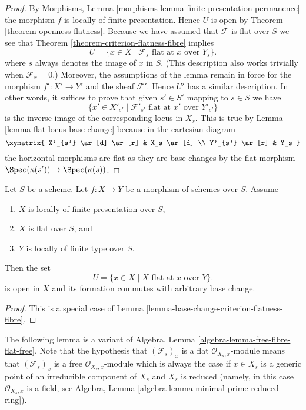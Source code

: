 \begin{proof}
By
Morphisms, Lemma \ref{morphisms-lemma-finite-presentation-permanence}
the morphism $f$ is locally of finite presentation.
Hence $U$ is open by
Theorem \ref{theorem-openness-flatness}.
Because we have assumed that $\mathcal{F}$ is flat over $S$ we see that
Theorem \ref{theorem-criterion-flatness-fibre}
implies
$$
U = \{x \in X \mid \mathcal{F}_s \text{ flat at }x \text{ over }Y_s\}.
$$
where $s$ always denotes the image of $x$ in $S$. (This description also
works trivially when $\mathcal{F}_x = 0$.) Moreover, the assumptions
of the lemma remain in force for the morphism $f' : X' \to Y'$
and the sheaf $\mathcal{F}'$. Hence $U'$ has a similar description.
In other words, it suffices to prove that given
$s' \in S'$ mapping to $s \in S$ we have
$$
\{x' \in X'_{s'} \mid
\mathcal{F}'_{s'} \text{ flat at }x' \text{ over }Y'_{s'}\}
$$
is the inverse image of the corresponding locus in $X_s$.
This is true by
Lemma \ref{lemma-flat-locus-base-change}
because in the cartesian diagram
$$
\xymatrix{
X'_{s'} \ar[d] \ar[r] & X_s \ar[d] \\
Y'_{s'} \ar[r] & Y_s
}
$$
the horizontal morphisms are flat as they are base changes by the flat
morphism $\Spec(\kappa(s')) \to \Spec(\kappa(s))$.
\end{proof}

\begin{lemma}
\label{lemma-base-change-flatness-fibres}
Let $S$ be a scheme. Let $f : X \to Y$ be a morphism of schemes over $S$.
Assume
\begin{enumerate}
\item $X$ is locally of finite presentation over $S$,
\item $X$ is flat over $S$, and
\item $Y$ is locally of finite type over $S$.
\end{enumerate}
Then the set
$$
U = \{x \in X \mid X\text{ flat at }x \text{ over }Y\}.
$$
is open in $X$ and its formation commutes with arbitrary base change.
\end{lemma}

\begin{proof}
This is a special case of
Lemma \ref{lemma-base-change-criterion-flatness-fibre}.
\end{proof}

\noindent
The following lemma is a variant of
Algebra, Lemma \ref{algebra-lemma-free-fibre-flat-free}.
Note that the hypothesis
that $(\mathcal{F}_s)_x$ is a flat $\mathcal{O}_{X_s, x}$-module
means that $(\mathcal{F}_s)_x$ is a free $\mathcal{O}_{X_s, x}$-module
which is always the case if $x \in X_s$ is a generic point of an
irreducible component of $X_s$ and $X_s$ is reduced (namely, in
this case $\mathcal{O}_{X_s, x}$ is a field, see
Algebra, Lemma \ref{algebra-lemma-minimal-prime-reduced-ring}).

